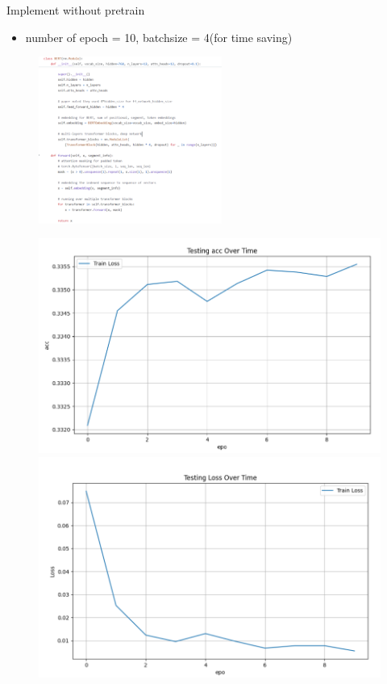\documentclass{beamer}
\begin{document}
\begin{frame}{Implement without pretrain}
  \begin{itemize}
    \item number of epoch = 10, batchsize = 4(for time saving)
  \end{itemize}
  \begin{figure}[H]
    \centering
    \includegraphics[width=6cm]{pictures/withoutpre.png}
  \end{figure}
\end{frame}
\begin{frame}
  \begin{figure}[htbp]
    \centering
    \begin{minipage}{0.49\linewidth}
      \centering
      \includegraphics[width=0.9\linewidth]{pictures/accwp.png}
    \end{minipage}
    \begin{minipage}{0.49\linewidth}
      \centering
      \includegraphics[width=0.9\linewidth]{pictures/losswp.png}
    \end{minipage}
  \end{figure}
\end{frame}
\end{document}
